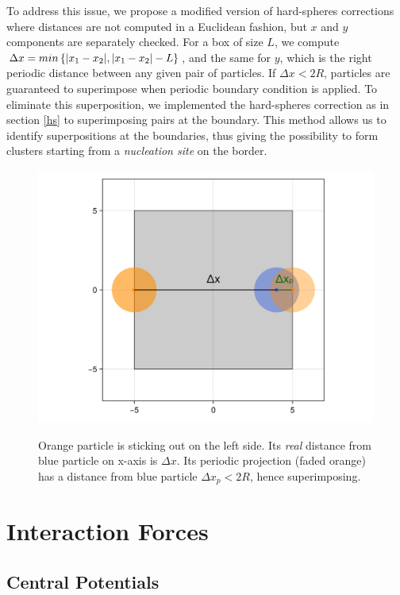 \documentclass[../../master_thesis_np.tex]{subfiles}
\begin{document}
	To address this issue, we propose a modified version of hard-spheres corrections where distances are not computed in a Euclidean fashion, but $x$ and $y$ components are separately checked.
	For a box of size $L$, we compute $\Delta x = min \left\{ \abs{x_1-x_2}, \abs{x_1-x_2}-L \right\}$, and the same for $y$, which is the right periodic distance between any given pair of particles.
	If $\Delta x < 2R$, particles are guaranteed to superimpose when periodic boundary condition is applied.
	To eliminate this superposition, we implemented the hard-spheres correction as in section \ref{hs} to superimposing pairs at the boundary.
	This method allows us to identify superpositions at the boundaries, thus giving the possibility to form clusters starting from a \emph{nucleation site} on the border. 
	
	\begin{figure}[htp]
		\centering
		\includegraphics[width = \textwidth]{periodic_hs.png}
		\label{fig:periodic_hs}
		\caption{Orange particle is sticking out on the left side. Its \emph{real} distance from blue particle on x-axis is $\Delta x$. Its periodic projection (faded orange) has a distance from blue particle $\Delta x_p < 2R$, hence superimposing.}
	\end{figure}

	\section{Interaction Forces}
	
	\subsection{Central Potentials}
\end{document}
